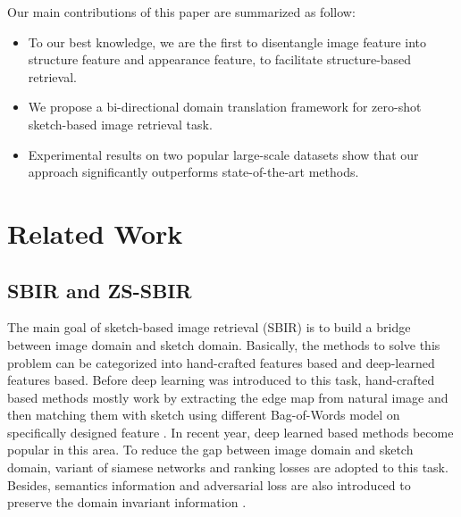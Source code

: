 \documentclass[10pt,twocolumn,letterpaper]{article}
\begin{document}
Our main contributions of this paper are summarized as follow:
\begin{itemize}
	\item To our best knowledge, we are the first to disentangle image feature into structure feature and appearance feature, to facilitate structure-based retrieval.
	\item We propose a bi-directional domain translation framework for zero-shot sketch-based image retrieval task.
	\item Experimental results on two popular large-scale datasets show that our approach significantly outperforms state-of-the-art methods.
\end{itemize}






\section{Related Work}

\subsection{SBIR and ZS-SBIR}
The main goal of sketch-based image retrieval (SBIR) is to build a bridge between image domain and sketch domain. Basically, the methods to solve this problem can be categorized into hand-crafted features based and deep-learned features based. Before deep learning was introduced to this task, hand-crafted based methods mostly work by extracting the edge map from natural image and then matching them with sketch using different Bag-of-Words model on specifically designed feature \cite{saavedra2015sketch, hu2013performance, eitz2010sketch, hu2011bag, eitz2010evaluation}. In recent year, deep learned based methods become popular in this area. To reduce the gap between image domain and sketch domain, variant of siamese networks \cite{qi2016sketch, sangkloy2016sketchy, song2017deep} and ranking losses \cite{chopra2005learning, sangkloy2016sketchy} are adopted to this task. Besides, semantics information and adversarial loss are also introduced to preserve the domain invariant information \cite{chen2018deep}.
\end{document}
